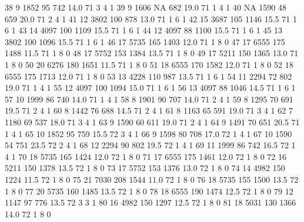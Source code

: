 \documentclass{article}
\begin{document}
\begin{Schunk}
\begin{Soutput}
38        9  1852  95  742 14.0  71      3       4        1
39        9  1606  NA  682 19.0  71      1       4        1
40       NA  1590  48  659 20.0  71      2       4        1
41       12  3802 100  878 13.0  71      1       6        1
42       15  3687 105 1146 15.5  71      1       6        1
43       14  4097 100 1109 15.5  71      1       6        1
44       12  4097  88 1100 15.5  71      1       6        1
45       13  3802 100 1096 15.5  71      1       6        1
46       17  5735 165 1403 12.0  71      1       8        0
47       17  6555 175 1488 11.5  71      1       8        0
48       17  5752 153 1384 13.5  71      1       8        0
49       17  5211 150 1365 13.0  71      1       8        0
50       20  6276 180 1651 11.5  71      1       8        0
51       18  6555 170 1582 12.0  71      1       8        0
52       18  6555 175 1713 12.0  71      1       8        0
53       13  4228 110  987 13.5  71      1       6        1
54       11  2294  72  802 19.0  71      1       4        1
55       12  4097 100 1094 15.0  71      1       6        1
56       13  4097  88 1046 14.5  71      1       6        1
57       10  1999  86  740 14.0  71      1       4        1
58        8  1901  90  707 14.0  71      2       4        1
59        8  1295  70  691 19.5  71      2       4        1
60        8  1442  76  688 14.5  71      2       4        1
61        8  1163  65  591 19.0  71      3       4        1
62        7  1180  69  537 18.0  71      3       4        1
63        9  1590  60  611 19.0  71      2       4        1
64        9  1491  70  651 20.5  71      1       4        1
65       10  1852  95  759 15.5  72      3       4        1
66        9  1598  80  708 17.0  72      1       4        1
67       10  1590  54  751 23.5  72      2       4        1
68       12  2294  90  802 19.5  72      1       4        1
69       11  1999  86  742 16.5  72      1       4        1
70       18  5735 165 1424 12.0  72      1       8        0
71       17  6555 175 1461 12.0  72      1       8        0
72       16  5211 150 1378 13.5  72      1       8        0
73       17  5752 153 1376 13.0  72      1       8        0
74       14  4982 150 1224 11.5  72      1       8        0
75       21  7030 208 1544 11.0  72      1       8        0
76       18  5735 155 1500 13.5  72      1       8        0
77       20  5735 160 1485 13.5  72      1       8        0
78       18  6555 190 1474 12.5  72      1       8        0
79       12  1147  97  776 13.5  72      3       3        1
80       16  4982 150 1297 12.5  72      1       8        0
81       18  5031 130 1366 14.0  72      1       8        0

\end{Soutput}
\end{Schunk}
\end{document}
